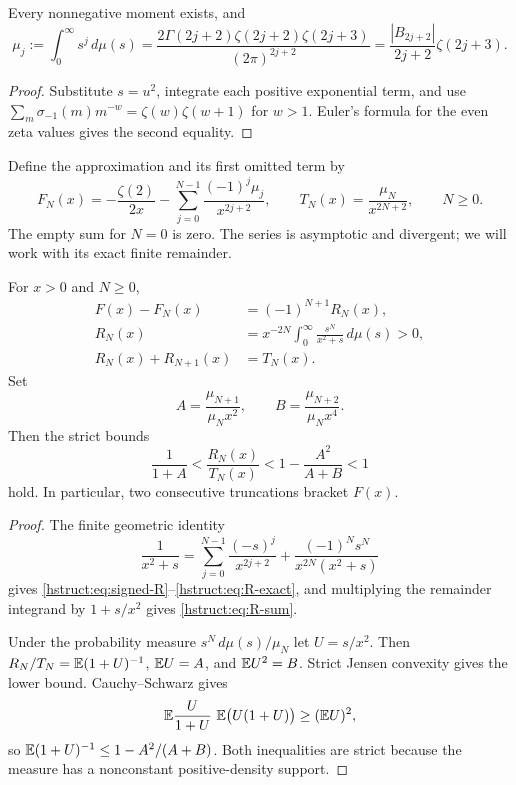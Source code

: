 \begin{lemma}\label{hstruct:lem:moments}
Every nonnegative moment exists, and
\begin{equation}\label{hstruct:eq:moments}
 \mu_j:=\int_0^\infty s^j\,d\mu(s)
 =\frac{2\Gamma(2j+2)\zeta(2j+2)\zeta(2j+3)}
        {(2\pi)^{2j+2}}
 =\frac{|B_{2j+2}|}{2j+2}\zeta(2j+3).
\end{equation}
\end{lemma}
\begin{proof}
Substitute $s=u^2$, integrate each positive exponential term, and use
$\sum_m\sigma_{-1}(m)m^{-w}=\zeta(w)\zeta(w+1)$ for $w>1$.
Euler's formula for the even zeta values gives the second equality.
\end{proof}

Define the approximation and its first omitted term by
\begin{equation}\label{hstruct:eq:FN}
 F_N(x)=-\frac{\zeta(2)}{2x}
         -\sum_{j=0}^{N-1}\frac{(-1)^j\mu_j}{x^{2j+2}},
 \qquad T_N(x)=\frac{\mu_N}{x^{2N+2}},
 \qquad N\ge0.
\end{equation}
The empty sum for $N=0$ is zero. The series is asymptotic and divergent;
we will work with its exact finite remainder.

\begin{theorem}
\label{hstruct:thm:remainder}
For $x>0$ and $N\ge0$,
\begin{align}
 F(x)-F_N(x)&=(-1)^{N+1}R_N(x),\label{hstruct:eq:signed-R}\\
 R_N(x)&=x^{-2N}\int_0^\infty\frac{s^N}{x^2+s}\,d\mu(s)>0,
 \label{hstruct:eq:R-exact}\\
 R_N(x)+R_{N+1}(x)&=T_N(x).\label{hstruct:eq:R-sum}
\end{align}
Set
\[
 A=\frac{\mu_{N+1}}{\mu_Nx^2},\qquad
 B=\frac{\mu_{N+2}}{\mu_Nx^4}.
\]
Then the strict bounds
\begin{equation}\label{hstruct:eq:three-moment}
 \frac1{1+A}<\frac{R_N(x)}{T_N(x)}
       <1-\frac{A^2}{A+B}<1
\end{equation}
hold. In particular, two consecutive truncations bracket $F(x)$.
\end{theorem}
\begin{proof}
The finite geometric identity
\[
 \frac1{x^2+s}
 =\sum_{j=0}^{N-1}\frac{(-s)^j}{x^{2j+2}}
    +\frac{(-1)^Ns^N}{x^{2N}(x^2+s)}
\]
gives \eqref{hstruct:eq:signed-R}--\eqref{hstruct:eq:R-exact}, and multiplying the
remainder integrand by $1+s/x^2$ gives \eqref{hstruct:eq:R-sum}.

Under the probability measure $s^N\,d\mu(s)/\mu_N$ let $U=s/x^2$.
Then $R_N/T_N=\mathbb E(1+U)^{-1}$, $\mathbb E U=A$, and $\mathbb E U^2=B$.
Strict Jensen convexity gives the lower bound. Cauchy--Schwarz gives
\[
 \E\frac{U}{1+U}\ \E\bigl(U(1+U)\bigr)\ge(\E U)^2,
\]
so $\mathbb E(1+U)^{-1}\le1-A^2/(A+B)$. Both inequalities are strict
because the measure has a nonconstant positive-density support.
\end{proof}

